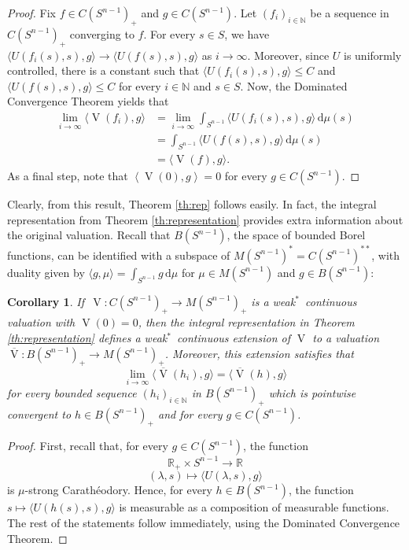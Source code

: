 \documentclass[11pt, a4paper]{amsart}
\newtheorem{corollary}[proposition]{Corollary}
\renewcommand{\d}{\,\mathrm{d}}
\newcommand{\rp}{\mathbb R_{\scriptscriptstyle +}}
\newcommand{\sn}{{S^{n-1}}}
\renewcommand{\d}{\,\mathrm{d}}
\newcommand{\oV}{\operatorname{V}}
\newcommand{\measn}{M(\sn )_{\scriptscriptstyle +}}
\newcommand{\cfn}{C(\sn )_{\scriptscriptstyle +}}
\newcommand{\bfn}{B(\sn )_{\scriptscriptstyle +}}
\newcommand{\R}{\mathbb R}
\begin{document}
\begin{proof}
Fix $f\in \cfn$ and $g\in C(\sn)$. Let $(f_i)_{i\in \mathbb N}$ be a sequence in $\cfn$ converging to $f$. For every $s\in S$, we have $\langle U(f_i(s), s),g\rangle \rightarrow \langle U(f(s), s),g\rangle$ as $i\to\infty$. Moreover, since $U$ is uniformly controlled, there is a constant such that $\langle U(f_i(s), s),g\rangle \leq C$ and $\langle U(f(s), s),g\rangle \leq C$ for every $i\in \mathbb N$ and $s\in S$. 
Now, the Dominated Convergence Theorem yields that 
\begin{align*}
    \lim_{i\to\infty} \langle \oV(f_i),g\rangle &= \lim_{i\to\infty} \int_{\sn } \langle U(f_i(s), s),g\rangle \d\mu(s) \\&= \int_{\sn } \langle U(f(s), s),g\rangle \d\mu(s) \\[4pt]
    &=\langle \oV(f),g\rangle.
\end{align*} 
As a final step, note that $\left\langle\oV(0),g  \right\rangle=0$ for every $g\in C(\sn)$.
\end{proof}

Clearly, from this result, Theorem \ref{th:rep} follows easily. In fact, the integral representation from Theorem \ref{th:representation} provides extra information about the original valuation. Recall that $B(\sn )$, the space of bounded Borel functions, can be identified with a subspace of $M(\sn )^*=C(\sn )^{**}$, with duality given by $\langle g,\mu\rangle=\int_{\sn} g \d\mu$ for $\mu\in M(\sn )$ and $g\in B(\sn )$:

\begin{corollary}\label{co: extension}
If $\,\oV\colon \cfn\to \measn$ is a weak$^*$~continuous valuation with $\oV(0)=0$, then the integral representation in Theorem \ref{th:representation} defines a weak$^*$~continuous extension of $\oV$ to a valuation $\overline{\oV}\colon \bfn\to \measn$.
Moreover, this extension satisfies that 
$$\lim_{i\to\infty} \langle \overline{\oV}(h_i),g\rangle= \langle \overline{\oV}(h),g\rangle$$
for every bounded sequence $(h_i)_{i\in \mathbb N}$ in $\bfn$ which is pointwise convergent to $h\in \bfn$ and for every $g\in C(\sn )$.
\end{corollary}

\begin{proof}
First, recall that, for every $g\in C(\sn )$,  the function 
$$\rp\times \sn \to \R$$
$$(\lambda, s) \mapsto \langle U(\lambda, s),g\rangle$$ is $\mu$-strong Carath\'eodory. Hence, for every $h\in B(\sn )$, the function $s\mapsto \langle U(h(s), s),g\rangle$ is measurable as a composition of measurable functions. 
The rest of the statements follow immediately, using the Dominated Convergence Theorem. 
\end{proof}
\end{document}
